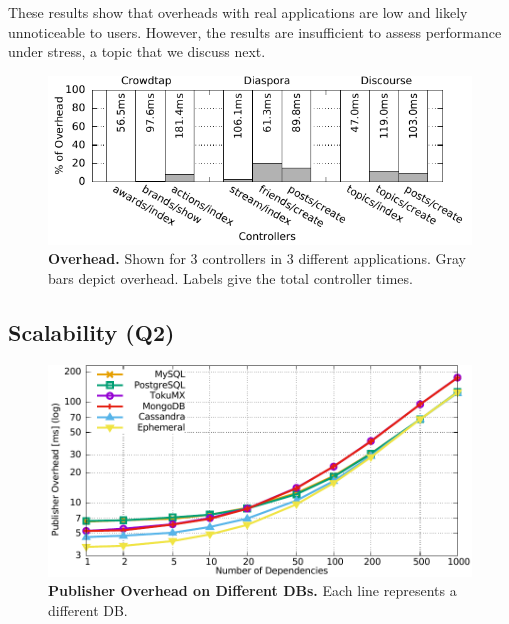 These results show that \synapse overheads with real applications are low and
likely unnoticeable to users. However, the results are insufficient to assess
performance under stress, a topic that we discuss next.

\begin{figure}[t]
 \centering
 \includegraphics[width=0.8\linewidth]{figures/synapse/overhead-hist.pdf}
 \caption{{\bf \synapse Overhead.} Shown for 3 controllers in 3 different
 applications. Gray bars depict overhead. Labels give the total controller times.}
 \label{synapse:fig:app-overheads}
\end{figure}



\subsection{Scalability (Q2)}
\label{synapse:sec:evaluation:scalability}

\begin{figure}[]
  \centering
  \includegraphics[width=\linewidth]{figures/synapse/overheadvsdeps.pdf}
  \caption{{\bf Publisher Overhead on Different DBs.} Each line represents a different DB.}
  \label{synapse:fig:overhead}
\end{figure}


